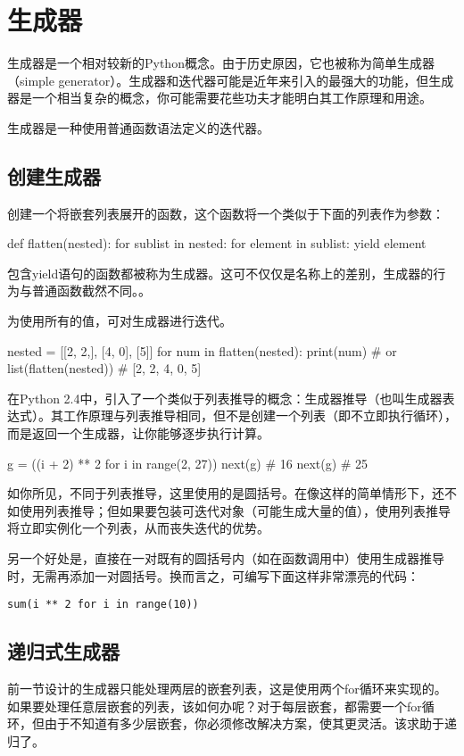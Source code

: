\section{生成器}
生成器是一个相对较新的Python概念。由于历史原因，它也被称为简单生成器（simple generator）。生成器和迭代器可能是近年来引入的最强大的功能，但生成器是一个相当复杂的概念，你可能需要花些功夫才能明白其工作原理和用途。

生成器是一种使用普通函数语法定义的迭代器。
\subsection{创建生成器}
创建一个将嵌套列表展开的函数，这个函数将一个类似于下面的列表作为参数：
\begin{pyc}
def flatten(nested):
    for sublist in nested:
        for element in sublist:
            yield element
\end{pyc}
包含yield语句的函数都被称为生成器。这可不仅仅是名称上的差别，生成器的行为与普通函数截然不同。。

为使用所有的值，可对生成器进行迭代。
\begin{pyc}
nested = [[2, 2,], [4, 0], [5]]
for num in flatten(nested):
    print(num)
# or
list(flatten(nested))  # [2, 2, 4, 0, 5]
\end{pyc}

\begin{tcolorbox}[title=简单生成器,colback=red!5]
在Python 2.4中，引入了一个类似于列表推导的概念：生成器推导（也叫生成器表达式）。其工作原理与列表推导相同，但不是创建一个列表（即不立即执行循环），而是返回一个生成器，让你能够逐步执行计算。
\begin{pyc}
g = ((i + 2) ** 2 for i in range(2, 27))
next(g)  # 16
next(g)  # 25
\end{pyc}

如你所见，不同于列表推导，这里使用的是圆括号。在像这样的简单情形下，还不如使用列表推导；但如果要包装可迭代对象（可能生成大量的值），使用列表推导将立即实例化一个列表，从而丧失迭代的优势。

另一个好处是，直接在一对既有的圆括号内（如在函数调用中）使用生成器推导时，无需再添加一对圆括号。换而言之，可编写下面这样非常漂亮的代码：

\verb|sum(i ** 2 for i in range(10))|
\end{tcolorbox}
\subsection{递归式生成器}
前一节设计的生成器只能处理两层的嵌套列表，这是使用两个for循环来实现的。如果要处理任意层嵌套的列表，该如何办呢？对于每层嵌套，都需要一个for循环，但由于不知道有多少层嵌套，你必须修改解决方案，使其更灵活。该求助于递归了。

